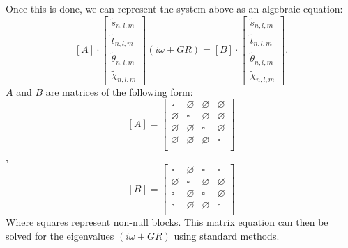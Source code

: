 \documentclass[a4paper,10pt]{book}
\newcommand{\warningbox}[1]{\fcolorbox{orange}{white}%
{\centering \parbox{0.9\textwidth}{ {\Large \red{Warning}}%
\vspace*{2mm}\\%
#1}}}
\newcommand\red[1]{{\color{red} #1}}
\begin{document}
Once this is done, we can represent the system above as an algebraic equation:
\begin{equation}
 \left[ A \right] \cdot
 \begin{bmatrix}
    \tilde s_{n,l,m}\\
    \tilde t_{n,l,m}\\
    \tilde \theta_{n,l,m}\\
    \tilde \chi_{n,l,m}
\end{bmatrix}
(i\omega +GR)  =
 \left[ B \right]
        \cdot
        \begin{bmatrix}
        \tilde s_{n,l,m}\\
        \tilde t_{n,l,m}\\
        \tilde \theta_{n,l,m}\\
        \tilde \chi_{n,l,m}
        \end{bmatrix}.
\end{equation}
$A$ and $B$ are matrices of the following form:
\begin{equation}
\left[ A \right] =
\begin{bmatrix}
\square     & \varnothing & \varnothing & \varnothing \\
\varnothing & \square     & \varnothing & \varnothing \\
\varnothing & \varnothing & \square     & \varnothing \\
\varnothing & \varnothing & \varnothing & \square \\
\end{bmatrix}
\end{equation},
\begin{equation}
\left[ B \right] =
\begin{bmatrix}
\square     & \varnothing & \square     & \square     \\
\varnothing & \square     & \varnothing & \varnothing \\
\square     & \varnothing & \square     & \varnothing \\
\square     & \varnothing & \varnothing & \square     \\
\end{bmatrix}
\end{equation}
Where squares represent non-null blocks.
This matrix equation can then be solved for the eigenvalues $(i\omega +GR)$
using standard methods.

\end{document}
